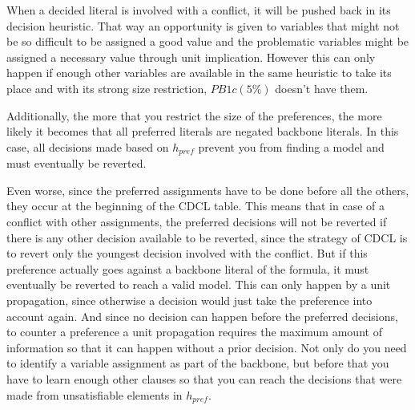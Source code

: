 When a decided literal is involved with a conflict, it will be pushed back in its decision heuristic. That way an opportunity is given to variables that might not be so difficult to be assigned a good value and the problematic variables might be assigned a necessary value through unit implication. 
However this can only happen if enough other variables are available in the same heuristic to take its place and with its strong size restriction, $PB1c(5\%)$ doesn't have them.

Additionally, the more that you restrict the size of the preferences, the more likely it becomes that all preferred literals are negated backbone literals. In this case, all decisions made based on $h_{pref}$ prevent you from finding a model and must eventually be reverted.

Even worse, since the preferred assignments have to be done before all the others, they occur at the beginning of the CDCL table. This means that in case of a conflict with other assignments, the preferred decisions will not be reverted if there is any other decision available to be reverted, since the strategy of CDCL is to revert only the youngest decision involved with the conflict. But if this preference actually goes against a backbone literal of the formula, it must eventually be reverted to reach a valid model. This can only happen by a unit propagation, since otherwise a decision would just take the preference into account again. And since no decision can happen before the preferred decisions, to counter a preference a unit propagation requires the maximum amount of information so that it can happen without a prior decision. Not only do you need to identify a variable assignment as part of the backbone, but before that you have to learn enough other clauses so that you can reach the decisions that were made from unsatisfiable elements in $h_{pref}$.





